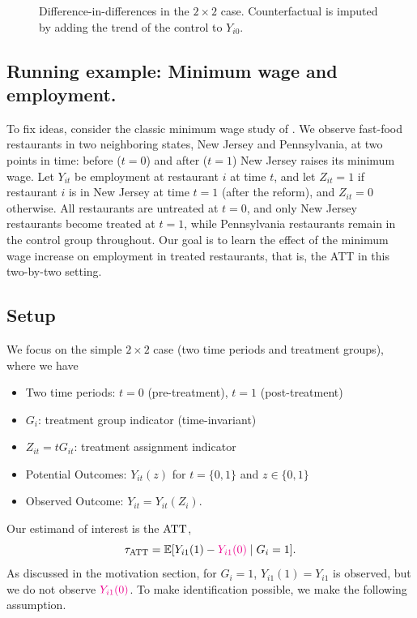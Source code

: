 \documentclass[11pt]{exam}
\begin{document}
\begin{figure}[htbp]
  \caption{Difference-in-differences in the $2 \times 2$ case. Counterfactual is imputed by adding the trend of the control to $Y_{i0}$.}
  \label{fig:parallel_trend}
\end{figure}

\subsection{Running example: Minimum wage and employment.}
To fix ideas, consider the classic minimum wage study of \citet{card1993minimum}.
We observe fast-food restaurants in two neighboring states, New Jersey and
Pennsylvania, at two points in time: before ($t=0$) and after ($t=1$) New Jersey
raises its minimum wage. Let $Y_{it}$ be employment at restaurant $i$ at time $t$,
and let $Z_{it}=1$ if restaurant $i$ is in New Jersey at time $t=1$ (after the
reform), and $Z_{it}=0$ otherwise. All restaurants are untreated at $t=0$, and only
New Jersey restaurants become treated at $t=1$, while Pennsylvania restaurants
remain in the control group throughout. Our goal is to learn the effect of the
minimum wage increase on employment in treated restaurants, that is, the ATT in
this two-by-two setting.

\subsection{Setup}
We focus on the simple $2 \times 2$ case (two time periods and treatment groups), where we have
\begin{itemize}
    \item Two time periods: $t = 0$ (pre-treatment), $t = 1$ (post-treatment)
    \item $G_i$: treatment group indicator (time-invariant)
    \item $Z_{it} = tG_{it}$: treatment assignment indicator
    \item Potential Outcomes: $Y_{it}(z)$ for $t = \{0, 1\}$ and $z \in \{0, 1\}$
    \item Observed Outcome: $Y_{it} = Y_{it}(Z_i)$.
\end{itemize}
Our estimand of interest is the $\mathrm{ATT}$,
\[
    \tau_{\mathrm{ATT}} = \mathbb{E}[Y_{i1}(1) - \textcolor{magenta}{Y_{i1}(0)} \mid G_i = 1].
\]
As discussed in the motivation section, for $G_i = 1$, $Y_{i1}(1) = Y_{i1}$ is observed, but we do not observe $\textcolor{magenta}{Y_{i1}(0)}$. To make identification possible, we make the following assumption.
\end{document}
